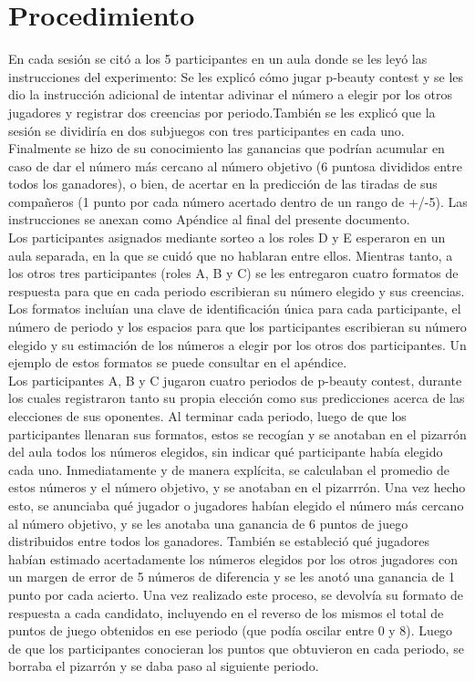 \section{Procedimiento}

En cada sesión se citó a los 5 participantes en un aula donde se les leyó las instrucciones del experimento: Se les explicó cómo jugar p-beauty contest y se les dio la instrucción adicional de  intentar adivinar el número a elegir por los otros jugadores y registrar dos creencias por periodo.También se les explicó que la sesión se dividiría en dos subjuegos con tres participantes en cada uno. Finalmente se hizo de su conocimiento las ganancias que podrían acumular en caso de dar el número más cercano al número objetivo (6 puntosa divididos entre todos los ganadores), o bien, de acertar en la predicción de las tiradas de sus compañeros (1 punto por cada número acertado dentro de un rango de +/-5). Las instrucciones se anexan como Apéndice al final del presente documento.\\

Los participantes asignados mediante sorteo a los roles D y E esperaron en un aula separada, en la que se cuidó que no hablaran entre ellos. Mientras tanto, a los otros tres participantes (roles A, B y C) se les entregaron cuatro formatos de respuesta para que en cada periodo escribieran su número elegido y sus creencias. Los formatos incluían una clave de identificación única para cada participante, el número de periodo y los espacios para que los participantes escribieran su número elegido y su estimación de los números a elegir por los otros dos participantes. Un ejemplo de estos formatos se puede consultar en el apéndice.\\

Los participantes A, B y C jugaron cuatro periodos de p-beauty contest, durante los cuales registraron tanto su propia elección como sus predicciones acerca de las elecciones de sus oponentes. Al terminar cada periodo, luego de que los participantes llenaran sus formatos, estos se recogían y se anotaban en el pizarrón del aula todos los números elegidos, sin indicar qué participante había elegido cada uno. Inmediatamente y de manera explícita, se calculaban el promedio de estos números y el número objetivo, y se anotaban en el pizarrrón. Una vez hecho esto, se anunciaba qué jugador o jugadores habían elegido el número más cercano al número objetivo, y se les anotaba una ganancia de 6 puntos de juego distribuidos entre todos los ganadores. También se estableció qué jugadores habían estimado acertadamente los números elegidos por los otros jugadores con un margen de error de 5 números de diferencia y se les anotó una ganancia de 1 punto por cada acierto. Una vez realizado este proceso, se devolvía su formato de respuesta a cada candidato, incluyendo en el reverso de los mismos el total de puntos de juego obtenidos en ese periodo (que podía oscilar entre 0 y 8). Luego de que los participantes conocieran los puntos que obtuvieron en cada periodo, se borraba el pizarrón y se daba paso al siguiente periodo.\\

